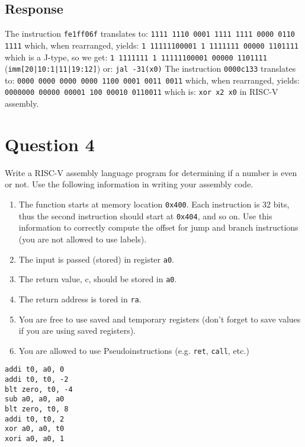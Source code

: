 \documentclass{article}
\begin{document}
\subsection*{Response}
The instruction \texttt{fe1ff06f} translates to:
\newline
\texttt{1111 1110 0001 1111 1111 0000 0110 1111} which, when rearranged, yields:
\newline
\texttt{1 11111100001 1 1111111 00000 1101111} which is a J-type, so we get:
\newline
\texttt{1 1111111 1 11111100001 00000 1101111} (\texttt{imm[20|10:1|11|19:12]}) or:
\newline
\texttt{jal -31(x0)}
\newline
\newline
\newline
The instruction \texttt{0000c133} translates to:
\newline
\texttt{0000 0000 0000 0000 1100 0001 0011 0011} which, when rearranged, yields:
\newline
\texttt{0000000 00000 00001 100 00010 0110011} which is:
\newline
\newline
\texttt{xor x2 x0} in RISC-V assembly.





\newpage
\section*{Question 4}
Write a RISC-V assembly language program for determining if a number is even or not.
\newline
\newline
Use the following information in writing your assembly code.
\begin{enumerate}
\item The function starts at memory location \texttt{0x400}. Each instruction is 32 bits, thus the
  second instruction should start at \texttt{0x404}, and so on. Use this information to correctly
  compute the offset for jump and branch instructions (you are not allowed to use labels).
\item The input is passed (stored) in register \texttt{a0}.
\item The return value, c, should be stored in \texttt{a0}.
\item The return address is tored in \texttt{ra}.
\item You are free to use saved and temporary registers (don't forget to save values if you are
  using saved registers).
\item You are allowed to use Pseudoinstructions (e.g. \texttt{ret}, \texttt{call}, etc.)
\end{enumerate}

\begin{verbatim}
addi t0, a0, 0
addi t0, t0, -2
blt zero, t0, -4
sub a0, a0, a0
blt zero, t0, 8
addi t0, t0, 2
xor a0, a0, t0
xori a0, a0, 1
\end{verbatim}
\end{document}
